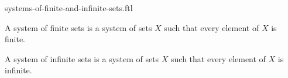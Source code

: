 \documentclass{naproche-library}
\begin{document}
\begin{smodule}[title=Systems of Finite and Infinite Sets]{systems-of-finite-and-infinite-sets.ftl}

\begin{definition}[forthel,id=FOUNDATIONS_14_1387314525765632]
  A system of finite sets is a system of sets $X$ such that every element of $X$ is finite.
\end{definition}

\begin{definition}[forthel,id=FOUNDATIONS_14_5698452102154785]
  A system of infinite sets is a system of sets $X$ such that every element of $X$ is infinite.
\end{definition}
\end{smodule}
\end{document}
